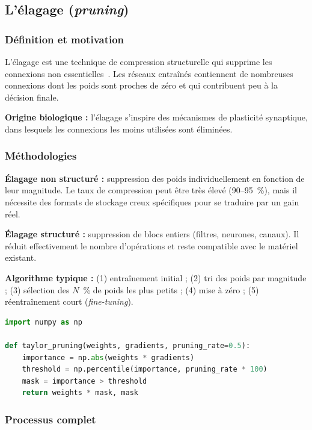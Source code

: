 \subsection{L'élagage (\emph{pruning})}

\subsubsection{Définition et motivation}

L'élagage est une technique de compression structurelle qui supprime les
connexions non essentielles~\cite{han2016deep}. Les réseaux entraînés
contiennent de nombreuses connexions dont les poids sont proches de zéro et qui
contribuent peu à la décision finale.

\textbf{Origine biologique :} l'élagage s'inspire des mécanismes de plasticité
synaptique, dans lesquels les connexions les moins utilisées sont éliminées.

\subsubsection{Méthodologies}

\textbf{Élagage non structuré :} suppression des poids individuellement en
fonction de leur magnitude. Le taux de compression peut être très élevé
(90--95~\%), mais il nécessite des formats de stockage creux spécifiques pour
se traduire par un gain réel.

\textbf{Élagage structuré :} suppression de blocs entiers (filtres, neurones,
canaux). Il réduit effectivement le nombre d'opérations et reste compatible
avec le matériel existant.

\textbf{Algorithme typique :} (1) entraînement initial ; (2) tri des poids par
magnitude ; (3) sélection des $N$~\% de poids les plus petits ; (4) mise à
zéro ; (5) réentraînement court (\emph{fine-tuning}).

\begin{lstlisting}[language=Python, caption={Élagage fondé sur un critère d'importance (approximation de Taylor).}, label={lst:pruning}]
import numpy as np

def taylor_pruning(weights, gradients, pruning_rate=0.5):
    importance = np.abs(weights * gradients)
    threshold = np.percentile(importance, pruning_rate * 100)
    mask = importance > threshold
    return weights * mask, mask
\end{lstlisting}

\subsubsection{Processus complet}

